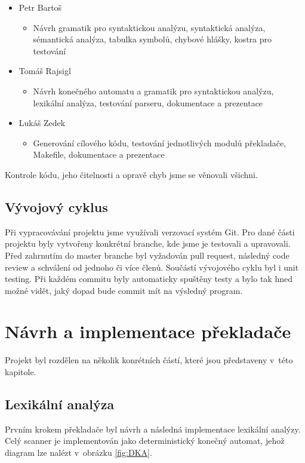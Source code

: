\documentclass[a4paper,12pt]{article}
\begin{document}
\begin{itemize}
	\item Petr Bartoš
	      \begin{itemize}
	      	\item Návrh gramatik pro syntaktickou analýzu, syntaktická analýza, sémantická analýza, tabulka symbolů, chybové hlášky, kostra pro testování
	      \end{itemize}
	\item Tomáš Rajsigl 
	      \begin{itemize}
	      	\item Návrh konečného automatu a gramatik pro syntaktickou analýzu, lexikální analýza, testování parseru, dokumentace a prezentace
	      \end{itemize}
	\item Lukáš Zedek
	      \begin{itemize}
	      	\item Generování cílového kódu, testování jednotlivých modulů překladače, Makefile, dokumentace a  prezentace
	      \end{itemize}
\end{itemize}
Kontrole kódu, jeho čitelnosti a opravě chyb jsme se věnovali všichni.
\subsection{Vývojový cyklus}
Při vypracovávání projektu jsme využívali verzovací systém Git. Pro dané části projektu byly vytvořeny konkrétní branche, kde jsme je testovali a upravovali. Před zahrnutím do master branche byl vyžadován pull request, následný code review a schválení od jednoho či více členů. Součástí vývojového cyklu byl i unit testing. Při každém commitu byly automaticky spuštěny testy a bylo tak hned možné vidět, jaký dopad bude commit mít na výsledný program.
\clearpage

\section{Návrh a implementace překladače}
Projekt byl rozdělen na několik konrétních částí, které jsou představeny v~této kapitole.

\subsection{Lexikální analýza}
Prvním krokem překladače byl návrh a následná implementace lexikální analýzy. Celý scanner je implementován jako deterministický konečný automat, jehož diagram lze nalézt v~obrázku \ref*{fig:DKA}.
\end{document}
